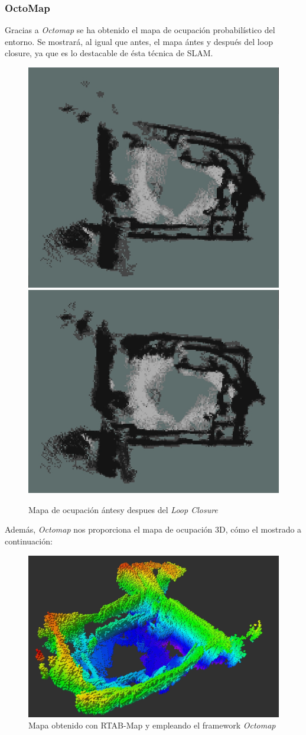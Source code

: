 \subsubsection{OctoMap}
Gracias a \textit{Octomap} se ha obtenido el mapa de ocupación probabilístico del entorno. Se mostrará, al igual que antes, el mapa ántes y después del loop closure, ya que es lo
destacable de ésta técnica de SLAM.
\begin{figure}[h!]
    \centering
    \includegraphics[width=.4\textwidth]{images/slam/bag1_occupGrid_noLC}
    \includegraphics[width=.435\textwidth]{images/slam/bag1_occupGrid_LC}
    \caption{Mapa de ocupación ántesy despues del \textit{Loop Closure}}
\end{figure}

Además, \textit{Octomap} nos proporciona el mapa de ocupación 3D, cómo el mostrado a continuación:
\begin{figure}[h!]
    \centering
    \includegraphics[width=.9\textwidth]{images/slam/bag1_octomap_LC}
    \caption{Mapa obtenido con RTAB-Map y empleando el framework \textit{Octomap}}
\end{figure}

